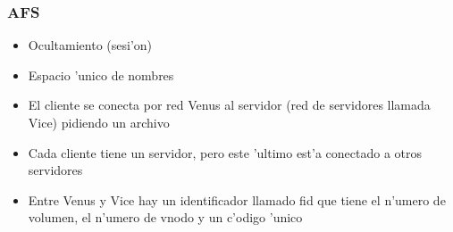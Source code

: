 \documentclass[a4paper,spanish]{article}
\begin{document}
\subsubsection{AFS}
\begin{itemize}
	\item Ocultamiento (sesi'on)
	\item Espacio 'unico de nombres
	\item El cliente se conecta por red Venus al servidor (red de
servidores llamada Vice) pidiendo un archivo
	\item Cada cliente tiene un servidor, pero este 'ultimo est'a conectado a
otros servidores
	\item Entre Venus y Vice hay un identificador llamado fid que tiene el
n'umero de volumen, el n'umero de vnodo y un c'odigo 'unico
\end{itemize}
\end{document}
